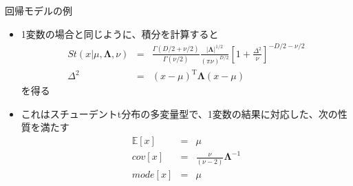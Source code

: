 \begin{frame}{回帰モデルの例}
 \begin{itemize}
  \item 1変数の場合と同じように、積分を計算すると
        \begin{eqnarray}
         St(x|\mu,\bm{\Lambda},\nu) &=& \frac{\Gamma(D/2+\nu/2)}{\Gamma(\nu/2)}\frac{|\bm{\Lambda}|^{1/2}}{(\pi\nu)^{D/2}}\left[1+\frac{\Delta^2}{\nu}\right]^{-D/2-\nu/2} \\
         \Delta^2&= & (x-\mu)^{\mathrm{T}}\bm{\Lambda}(x-\mu)
        \end{eqnarray}
        を得る
  \item これはスチューデントt分布の多変量型で、1変数の結果に対応した、次の性質を満たす
        \begin{eqnarray}
         \mathbb{E}[x]&=&\mu\\
         cov[x]&=&\frac{\nu}{(\nu-2)}\bm{\Lambda}^{-1}\\
         mode[x]& =& \mu
        \end{eqnarray}
 \end{itemize}
\end{frame}
